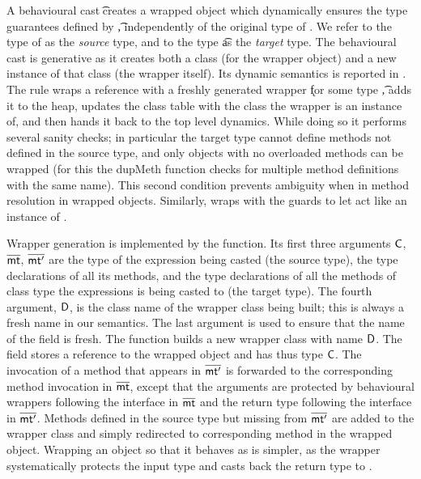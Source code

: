 \documentclass[acmlarge, anonymous, authordraft]{acmart}
\begin{document}
A behavioural cast \BehCast\t\a creates a wrapped object \ap which dynamically ensures the type
guarantees defined by \t, independently of the original type of \a.  We refer to the type of \a as the \emph{source} type, 
and to the type \t as the \emph{target} type.
The behavioural cast is generative as it creates both a class (for the wrapper object)
and a new instance of that class (the wrapper itself). Its dynamic semantics is reported in
. The rule  wraps a reference \a with a freshly generated
wrapper \k for some type \t, adds it to the heap, updates the class table with the class the wrapper is an instance of, 
and then hands it back to the top level dynamics. While doing so it performs several sanity checks; in particular the
target type cannot define methods not defined in the source type, and only objects with no overloaded methods can be wrapped 
(for this the \textsf{dupMeth} function checks for multiple method definitions with the same name).  This second condition 
prevents ambiguity when in method resolution in wrapped objects. Similarly,  wraps
\a with the guards to let \a act like an instance of \any.

Wrapper generation is implemented by the  function.  Its first three arguments \({\sf{C}}\), \(\overline{{\sf{mt}}}\), \(\overline{{\sf{mt'}}}\) are the type
of the expression being casted (the source type), the type declarations of all its methods, and the type declarations of all the
methods of class type the expressions is being casted to (the target type).  The fourth argument, \({\sf{D}}\), is the class name  of 
the wrapper class being built; this is always a fresh name in our semantics. The last argument is used to ensure that the name of
the \that field is  fresh.   The function  builds a new wrapper class with name \({\sf{D}}\).  The field  stores a 
reference to the wrapped object and has thus type \({\sf{C}}\).  The invocation of a method that appears in \(\overline{{\sf{mt'}}}\) is forwarded to 
the corresponding method invocation in \(\overline{{\sf{mt}}}\), except that the arguments are protected by behavioural wrappers following the
interface in \(\overline{{\sf{mt}}}\) and the return type following the interface in \(\overline{{\sf{mt'}}}\).    Methods defined in the source type but missing
from \(\overline{{\sf{mt'}}}\) are added to the wrapper class and simply redirected to corresponding method in the wrapped object.
Wrapping an object so that it behaves as \any is simpler, as the wrapper systematically protects the input type and casts back the 
return type to \any.
\end{document}
